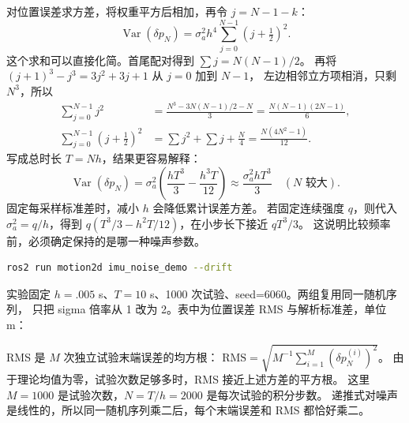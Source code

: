 对位置误差求方差，将权重平方后相加，再令 $j=N-1-k$：
\begin{equation}
\operatorname{Var}(\delta p_N)=\sigma_a^2h^4
\sum_{j=0}^{N-1}(j+\tfrac12)^2.
\end{equation}
这个求和可以直接化简。首尾配对得到 $\sum j=N(N-1)/2$。
再将 $(j+1)^3-j^3=3j^2+3j+1$ 从 $j=0$ 加到 $N-1$，
左边相邻立方项相消，只剩 $N^3$，所以
\begin{align}
\sum_{j=0}^{N-1}j^2&=\frac{N^3-3N(N-1)/2-N}{3}
=\frac{N(N-1)(2N-1)}6,\\
\sum_{j=0}^{N-1}(j+\tfrac12)^2
&=\sum j^2+\sum j+\frac N4=\frac{N(4N^2-1)}{12}.
\end{align}
写成总时长 $T=Nh$，结果更容易解释：
\begin{equation}
\operatorname{Var}(\delta p_N)=\sigma_a^2
\left(\frac{hT^3}{3}-\frac{h^3T}{12}\right)
\approx\frac{\sigma_a^2hT^3}{3}\quad(N\text{ 较大}).
\end{equation}
固定每采样标准差时，减小 $h$ 会降低累计误差方差。
若固定连续强度 $q$，则代入 $\sigma_a^2=q/h$，得到
$q(T^3/3-h^2T/12)$，在小步长下接近 $qT^3/3$。
这说明比较频率前，必须确定保持的是哪一种噪声参数。

\par\noindent\begin{minipage}{\linewidth}

\end{minipage}\par

\begin{lstlisting}[language=bash,numbers=none]
ros2 run motion2d imu_noise_demo --drift
\end{lstlisting}
实验固定 $h=.005$ s、$T=10$ s、1000 次试验、seed=6060。两组复用同一随机序列，
只把 sigma 倍率从 1 改为 2。表中为位置误差 RMS 与解析标准差，单位 m：
\begin{center}
\end{center}
RMS 是 $M$ 次独立试验末端误差的均方根：
$\mathrm{RMS}=\sqrt{M^{-1}\sum_{i=1}^M(\delta p_N^{(i)})^2}$。
由于理论均值为零，试验次数足够多时，RMS 接近上述方差的平方根。
这里 $M=1000$ 是试验次数，$N=T/h=2000$ 是每次试验的积分步数。
递推式对噪声是线性的，所以同一随机序列乘二后，每个末端误差和 RMS 都恰好乘二。

